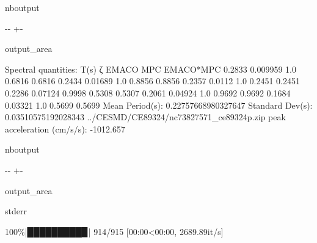 \documentclass[letterpaper,10pt,english]{sphinxmanual}
\begin{document}
\begin{sphinxuseclass}{nboutput}
{

\kern-\sphinxverbatimsmallskipamount\kern-\baselineskip
\kern+\FrameHeightAdjust\kern-\fboxrule
\vspace{\nbsphinxcodecellspacing}

\begin{sphinxuseclass}{output_area}
\begin{sphinxuseclass}{}


\begin{sphinxVerbatim}[commandchars=\\\{\}]
Spectral quantities:
       T(s)        ζ        EMACO        MPC     EMACO*MPC
      0.2833     0.009959   1.0        0.6816     0.6816
      0.2434     0.01689    1.0        0.8856     0.8856
      0.2357     0.0112     1.0        0.2451     0.2451
      0.2286     0.07124    0.9998     0.5308     0.5307
      0.2061     0.04924    1.0        0.9692     0.9692
      0.1684     0.03321    1.0        0.5699     0.5699
Mean Period(s): 0.22757668980327647
Standard Dev(s): 0.03510575192028343
../CESMD/CE89324/nc73827571\_ce89324p.zip
peak acceleration (cm/s/s): -1012.657
\end{sphinxVerbatim}



\end{sphinxuseclass}
\end{sphinxuseclass}
}

\end{sphinxuseclass}
\begin{sphinxuseclass}{nboutput}
{

\kern-\sphinxverbatimsmallskipamount\kern-\baselineskip
\kern+\FrameHeightAdjust\kern-\fboxrule
\vspace{\nbsphinxcodecellspacing}

\begin{sphinxuseclass}{output_area}
\begin{sphinxuseclass}{stderr}


\begin{sphinxVerbatim}[commandchars=\\\{\}]
100\%|█████████▉| 914/915 [00:00<00:00, 2689.89it/s]
\end{sphinxVerbatim}



\end{sphinxuseclass}
\end{sphinxuseclass}
}

\end{sphinxuseclass}
\end{document}
